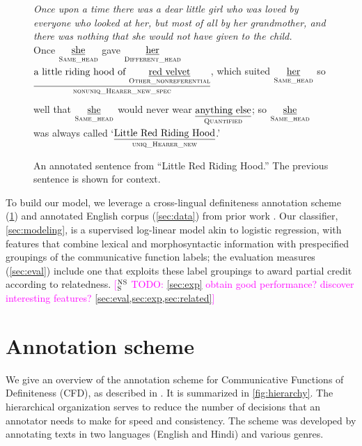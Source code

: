 \documentclass[11pt,letterpaper]{article}
\newcommand{\ensuretext}[1]{#1}
\newcommand{\nssmarker}{\ensuretext{\textcolor{magenta}{\ensuremath{^{\textsc{NS}}_{\textsc{S}}}}}}
\newcommand{\abmarker}{\ensuretext{\textcolor{red}{\ensuremath{^{\textsc{A}}_{\textsc{B}}}}}}
\newcommand{\arkcomment}[3]{\ensuretext{\textcolor{#3}{[#1 #2]}}}
\newcommand{\nss}[1]{\arkcomment{\nssmarker}{#1}{magenta}}
\newcommand{\ab}[1]{\arkcomment{\abmarker}{#1}{red}}
\newcommand{\glosst}[2]{\ensuremath{\underset{\textrm{#2}}{\uline{\textrm{#1}}}}} %
\newcommand{\llbl}[1]{\mbox{\textsc{#1}}} %
\begin{document}
\begin{figure*}[t]\small
\textit{Once upon a time there was a dear little girl who was loved by everyone who looked at her, but most of all by her grandmother, and there was nothing that she would not have given to the child.}
\\[5pt]
Once \glosst{she}{\llbl{Same\_head}} gave \glosst{her}{\llbl{Different\_head}} 
\glosst{a little riding hood of \glosst{red velvet}{\llbl{Other\_nonreferential}}}{$\underset{~}{\llbl{nonuniq\_Hearer\_new\_spec}}$}, 
which suited \glosst{her}{\llbl{Same\_head}} so well that \glosst{she}{\llbl{Same\_head}} 
would never wear \glosst{anything else}{\llbl{Quantified}}; so \glosst{she}{\llbl{Same\_head}} was always called 
`\glosst{Little Red Riding Hood}{\llbl{uniq\_Hearer\_new}}.'
\caption{An annotated sentence from ``Little Red Riding Hood.'' The previous sentence is shown for context.}
\label{fig:excerpt}
\end{figure*}

To build our model, we leverage a cross-lingual definiteness annotation scheme (\cref{sec:scheme}) 
and annotated English corpus (\cref{sec:data}) from prior work \citep{bhatia14}.
Our classifier, \cref{sec:modeling}, is a supervised log-linear model akin to logistic regression,
with features that combine lexical and morphosyntactic information 
with prespecified groupings of the communicative function labels; 
the evaluation measures (\cref{sec:eval}) include one that exploits these label groupings 
to award partial credit according to relatedness.
\nss{TODO: \cref{sec:exp} obtain good performance? discover interesting features? \cref{sec:eval,sec:exp,sec:related}}


\section{Annotation scheme}\label{sec:scheme}

We give an overview of the annotation scheme for Communicative Functions of Definiteness (CFD), as described in \citet{bhatia14}.
It is summarized in \cref{fig:hierarchy}. 
The hierarchical organization serves to reduce the number of decisions that an annotator needs to make
for speed and consistency.  
The scheme was developed by annotating texts in two languages (English and Hindi) and various genres.
\end{document}
